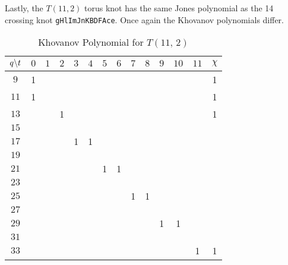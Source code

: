 \documentclass{article}
\theoremstyle{plain}
\begin{document}
        Lastly, the $T(11,2)$ torus knot has the same Jones polynomial as the
        14 crossing knot \texttt{gHlImJnKBDFAce}. Once again the Khovanov
        polynomials differ.
        \begin{table}[H]
            \centering
            \begin{tabular}{| c | c | c | c | c | c | c | c | c | c | c | c | c | c |}
                \hline
                $q\symbol{92}t$&$0$&$1$&$2$&$3$&$4$&$5$&$6$&$7$&$8$&$9$&$10$&$11$&$\chi$\\
                \hline
                $9$&1&&&&&&&&&&&&1\\
                \hline
                $11$&1&&&&&&&&&&&&1\\
                \hline
                $13$&&&1&&&&&&&&&&1\\
                \hline
                $15$&&&&&&&&&&&&&\\
                \hline
                $17$&&&&1&1&&&&&&&&\\
                \hline
                $19$&&&&&&&&&&&&&\\
                \hline
                $21$&&&&&&1&1&&&&&&\\
                \hline
                $23$&&&&&&&&&&&&&\\
                \hline
                $25$&&&&&&&&1&1&&&&\\
                \hline
                $27$&&&&&&&&&&&&&\\
                \hline
                $29$&&&&&&&&&&1&1&&\\
                \hline
                $31$&&&&&&&&&&&&&\\
                \hline
                $33$&&&&&&&&&&&&1&1\\
                \hline
            \end{tabular}
            \caption{Khovanov Polynomial for $T(11,\,2)$}
            \label{table:t_2_11_kho}
        \end{table}
\end{document}
